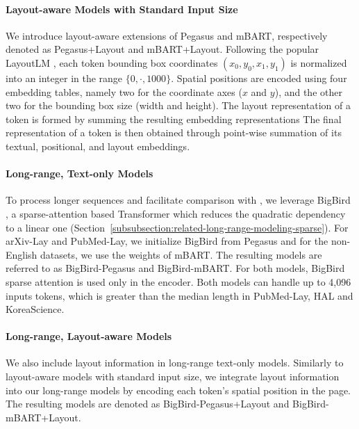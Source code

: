 \paragraph{Layout-aware Models with Standard Input Size}

We introduce layout-aware extensions of Pegasus and mBART, respectively denoted as Pegasus+Layout and mBART+Layout. Following the popular LayoutLM \citep{xu2020layoutlm}, each token bounding box coordinates $(x_0, y_0, x_1, y_1)$ is normalized into an integer in the range $\{0, \cdot, 1000\}$. Spatial positions are encoded using four embedding tables, namely two for the coordinate axes ($x$ and $y$), and the other two for the bounding box size (width and height). The layout representation of a token is formed by summing the resulting embedding representations
The final representation of a token is then obtained through point-wise summation of its textual, positional, and layout embeddings.

\paragraph{Long-range, Text-only Models}

To process longer sequences and facilitate comparison with \citet{zaheer2020big}, we leverage BigBird \citep{zaheer2020big}, a sparse-attention based Transformer which reduces the quadratic dependency to a linear one (Section~\ref{subsubsection:related-long-range-modeling-sparse}). For arXiv-Lay and PubMed-Lay, we initialize BigBird from Pegasus \citep{zaheer2020big} and for the non-English datasets, we use the weights of mBART. The resulting models are referred to as BigBird-Pegasus and BigBird-mBART. For both models, BigBird sparse attention is used only in the encoder. Both models can handle up to 4,096 inputs tokens, which is greater than the median length in PubMed-Lay, HAL and KoreaScience. 


\paragraph{Long-range, Layout-aware Models}

We also include layout information in long-range text-only models. Similarly to layout-aware models with standard input size, we integrate layout information into our long-range models by encoding each token's spatial position in the page. The resulting models are denoted as BigBird-Pegasus+Layout and BigBird-mBART+Layout.


